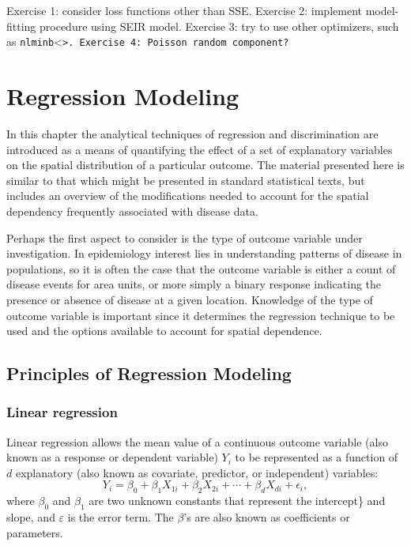 \documentclass[]{book}
\begin{document}
Exercise 1: consider loss functions other than SSE. Exercise 2:
implement model-fitting procedure using SEIR model. Exercise 3: try to
use other optimizers, such as
\texttt{nlminb}\textless{}\tt\textgreater{}. Exercise 4: Poisson random
component?

\chapter{Regression Modeling}\label{regression}

In this chapter the analytical techniques of regression and
discrimination are introduced as a means of quantifying the effect of a
set of explanatory variables on the spatial distribution of a particular
outcome. The material presented here is similar to that which might be
presented in standard statistical texts, but includes an overview of the
modifications needed to account for the spatial dependency frequently
associated with disease data.

Perhaps the first aspect to consider is the type of outcome variable
under investigation. In epidemiology interest lies in understanding
patterns of disease in populations, so it is often the case that the
outcome variable is either a count of disease events for area units, or
more simply a binary response indicating the presence or absence of
disease at a given location. Knowledge of the type of outcome variable
is important since it determines the regression technique to be used and
the options available to account for spatial dependence.

\section{Principles of Regression
Modeling}\label{principles-of-regression-modeling}

\subsection{Linear regression}\label{linear-regression}

Linear regression allows the mean value of a continuous outcome variable
(also known as a response or dependent variable) \(Y_i\) to be
represented as a function of \(d\) explanatory (also known as covariate,
predictor, or independent) variables: \[
Y_i=\beta_0+\beta_1X_{1i}+\beta_2X_{2i}+\cdots+\beta_dX_{di}+\epsilon_i,
\] where \(\beta_{0}\) and \(\beta_{1}\) are two unknown constants that
represent the intercept\} and slope, and \(\varepsilon\) is the error
term. The \(\beta\)'s are also known as coefficients or parameters.
\end{document}
